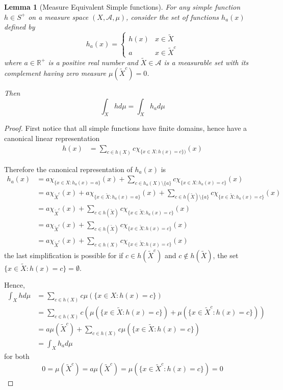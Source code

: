 \documentclass{article}
\newtheorem{lemma}[theorem]{Lemma}
\begin{document}
\begin{lemma}[Measure Equivalent Simple functions]
    For any simple function $h \in S^+$ on a measure space $(X, \mathcal A, \mu)$, consider the set of functions $h_a(x)$ defined by
    \[
        h_a(x) = \begin{cases}
            h(x) & x \in \tilde X\\
            a & x \in \tilde X^c
        \end{cases}
    \]
    where $a \in \mathbb{R}^+$ is a positive real number and $\tilde X \in \mathcal A$ is a measurable set with its complement having zero measure $\mu(\tilde X^c) = 0$.

    Then
    \[
        \int_X h d\mu = \int_X h_a d\mu
    \]
\end{lemma}
\begin{proof}
    First notice that all simple functions have finite domains, hence have a canonical linear representation
    \begin{align*}
        h(x) &= \sum_{c \in h(X)} c \chi_{\{x \in X \colon h(x) = c\})}(x)
    \end{align*}

    Therefore the canonical representation of $h_a(x)$ is
    \begin{align*}
        h_a(x) &= a \chi_{\{x \in X \colon h_a(x) = a\}}(x) + \sum_{c \in h_a(X) \setminus \{a\}} c \chi_{\{x \in X \colon h_a(x) = c\}}(x)\\
        &= a \chi_{\tilde X^c}(x) + a \chi_{\{x \in \tilde X \colon h_a(x) = a\}}(x) + \sum_{c \in h(\tilde X) \setminus \{a\}} c \chi_{\{x \in \tilde X \colon h_a(x) = c\}}(x)\\
        &= a \chi_{\tilde X^c}(x) + \sum_{c \in h(\tilde X)} c \chi_{\{x \in \tilde X \colon h_a(x) = c\}}(x)\\
        &= a \chi_{\tilde X^c}(x) + \sum_{c \in h(\tilde X)} c \chi_{\{x \in \tilde X \colon h(x) = c\}}(x)\\
        &= a \chi_{\tilde X^c}(x) + \sum_{c \in h(X)} c \chi_{\{x \in \tilde X \colon h(x) = c\}}(x)
    \end{align*}
    the last simplification is possible for if $c \in h(\tilde X^c)$ and $c \not\in h(\tilde X)$, the set $\{x \in \tilde X \colon h(x) = c\} = \emptyset$.

    Hence,
    \begin{align*}
        \int_X h d\mu &= \sum_{c \in h(X)} c \mu(\{x \in X \colon h(x) = c\})\\
        &= \sum_{c \in h(X)} c \left(\mu(\{x \in \tilde X \colon h(x) = c\}) + \mu(\{x \in \tilde X^c \colon h(x) = c\}) \right)\\
        &= a \mu(\tilde X^c) + \sum_{c \in h(X)} c \mu(\{x \in \tilde X \colon h(x) = c\})\\
        &= \int_X h_a d\mu
    \end{align*}
    for both
    \begin{align*}
        0 = \mu(\tilde X^c) = a \mu(\tilde X^c) = \mu(\{x \in \tilde X^c \colon h(x) = c\}) = 0
    \end{align*}
\end{proof}
\end{document}
